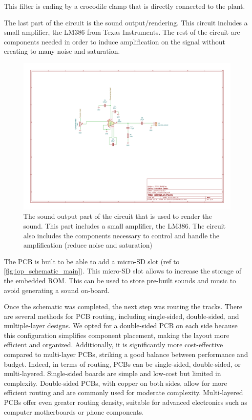 This filter is ending by a crocodile clamp that is directly connected to the plant.

The last part of the circuit is the sound output/rendering. This circuit includes a small amplifier,
the LM386 from Texas Instruments. The rest of the circuit are components needed in order to
induce amplification on the signal without creating to many noise and saturation.

\begin{figure}[H]
    \centering
    \includegraphics[width=\textwidth]{images/iop-audio_circuit.pdf}
    \caption{The sound output part of the circuit that is used to render the sound.
        This part includes a small amplifier, the LM386. The circuit also includes the components necessary
        to control and handle the amplification (reduce noise and saturation)}
    \vspace{0.1cm}
    \label{fig:iop_schematic_audio}
\end{figure}

The PCB is built to be able to add a micro-SD slot (ref to \ref{fig:iop_schematic_main}). This micro-SD slot
allows to increase the storage of the embedded ROM. This can be used to store pre-built sounds and music to avoid generating a sound on-board.


Once the schematic was completed, the next step was routing the tracks. There are several methods for PCB routing, including single-sided, double-sided, and multiple-layer designs. We opted for a double-sided PCB on each side because this configuration simplifies component placement, making the layout more efficient and organized. Additionally, it is significantly more cost-effective compared to multi-layer PCBs, striking a good balance between performance and budget. Indeed, in terms of routing, PCBs can be single-sided, double-sided, or multi-layered. Single-sided boards are simple and low-cost but limited in complexity. Double-sided PCBs, with copper on both sides, allow for more efficient routing and are commonly used for moderate complexity. Multi-layered PCBs offer even greater routing density, suitable for advanced electronics such as computer motherboards or phone components.

